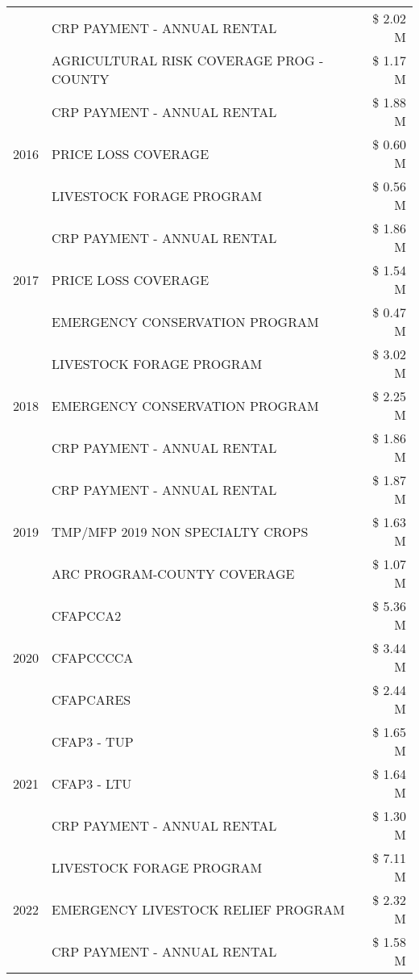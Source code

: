 \begin{tabular}{llr}
 & CRP PAYMENT - ANNUAL RENTAL & \$ 2.02 M \\
 & AGRICULTURAL RISK COVERAGE PROG - COUNTY & \$ 1.17 M \\
\cline{1-3}
\multirow[t]{3}{*}{2016} & CRP PAYMENT - ANNUAL RENTAL & \$ 1.88 M \\
 & PRICE LOSS COVERAGE & \$ 0.60 M \\
 & LIVESTOCK FORAGE PROGRAM & \$ 0.56 M \\
\cline{1-3}
\multirow[t]{3}{*}{2017} & CRP PAYMENT - ANNUAL RENTAL & \$ 1.86 M \\
 & PRICE LOSS COVERAGE & \$ 1.54 M \\
 & EMERGENCY CONSERVATION PROGRAM & \$ 0.47 M \\
\cline{1-3}
\multirow[t]{3}{*}{2018} & LIVESTOCK FORAGE PROGRAM & \$ 3.02 M \\
 & EMERGENCY CONSERVATION PROGRAM & \$ 2.25 M \\
 & CRP PAYMENT - ANNUAL RENTAL & \$ 1.86 M \\
\cline{1-3}
\multirow[t]{3}{*}{2019} & CRP PAYMENT - ANNUAL RENTAL & \$ 1.87 M \\
 & TMP/MFP 2019 NON SPECIALTY CROPS & \$ 1.63 M \\
 & ARC PROGRAM-COUNTY COVERAGE & \$ 1.07 M \\
\cline{1-3}
\multirow[t]{3}{*}{2020} & CFAPCCA2 & \$ 5.36 M \\
 & CFAPCCCCA & \$ 3.44 M \\
 & CFAPCARES & \$ 2.44 M \\
\cline{1-3}
\multirow[t]{3}{*}{2021} & CFAP3 - TUP & \$ 1.65 M \\
 & CFAP3 - LTU & \$ 1.64 M \\
 & CRP PAYMENT - ANNUAL RENTAL & \$ 1.30 M \\
\cline{1-3}
\multirow[t]{3}{*}{2022} & LIVESTOCK FORAGE PROGRAM & \$ 7.11 M \\
 & EMERGENCY LIVESTOCK RELIEF PROGRAM & \$ 2.32 M \\
 & CRP PAYMENT - ANNUAL RENTAL & \$ 1.58 M \\
\cline{1-3}
\bottomrule
\end{tabular}
